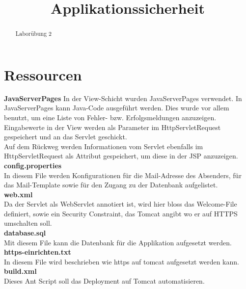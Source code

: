 \documentclass[12pt]{scrartcl}
\title{ %
Applikationssicherheit 
\vspace{0.2cm}
}
\begin{document}
 \maketitle
 \thispagestyle{firststyle}
 \pagestyle{firststyle}
 \begin{abstract}
 \begin{center}
 Laborübung 2
 \end{center}
 \vspace{0.5cm}
\hrulefill
\end{abstract}

 \pagestyle{documentstyle}
 \tableofcontents
 \pagebreak
\section{Ressourcen}
\textbf{JavaServerPages}\newline
In der View-Schicht wurden JavaServerPages verwendet. In JavaServerPages kann Java-Code ausgeführt werden. Dies wurde vor allem benutzt, um eine Liste von Fehler- bzw. Erfolgsmeldungen anzuzeigen.\\
Eingabewerte in der View werden als Parameter im HttpServletRequest gespeichert und an das Servlet geschickt.\\
Auf dem Rückweg werden Informationen vom Servlet ebenfalls im HttpServletRequest als Attribut gespeichert, um diese in der JSP anzuzeigen.\\

\textbf{config.properties}\\
In diesem File werden Konfigurationen für die Mail-Adresse des Absenders, für das Mail-Template sowie für den Zugang zu der Datenbank aufgelistet.\\

\textbf{web.xml}\\
Da der Servlet als WebServlet annotiert ist, wird hier bloss das Welcome-File definiert, sowie ein Security Constraint, das Tomcat angibt wo er auf HTTPS umschalten soll.\\

\textbf{database.sql}\\
Mit diesem File kann die Datenbank für die Applikation aufgesetzt werden.\\

\textbf{https-einrichten.txt}\\
In diesem File wird beschrieben wie https auf tomcat aufgesetzt werden kann.\\

\textbf{build.xml}\\
Dieses Ant Script soll das Deployment auf Tomcat automatisieren.
\end{document}
